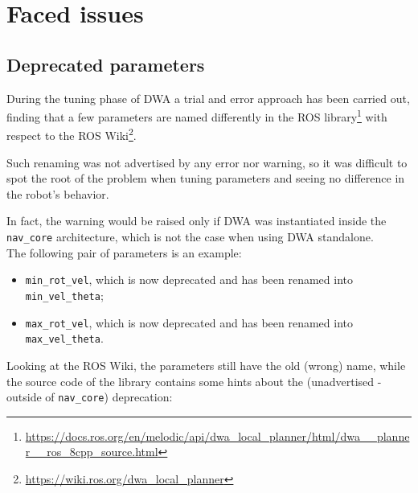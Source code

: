 \documentclass[11pt,a4paper]{article}
\begin{document}
\section{Faced issues}



\subsection{Deprecated parameters}

During the tuning phase of DWA a trial and error approach has been carried out, finding that
a few parameters are named differently in the ROS library\footnote
{\href{https://docs.ros.org/en/melodic/api/dwa\_local\_planner/html/dwa\_\_planner\_\_ros\_8cpp\_source.html}
{https://docs.ros.org/en/melodic/api/dwa\_local\_planner/html/dwa\_\_planner\_\_ros\_8cpp\_source.html}}
with respect to the ROS Wiki\footnote
{\href{https://wiki.ros.org/dwa\_local\_planner}{https://wiki.ros.org/dwa\_local\_planner}}.

Such renaming was not advertised by any error nor warning, so it was difficult to spot the root of the problem
when tuning parameters and seeing no difference in the robot's behavior.

In fact, the warning would be raised only if DWA was instantiated inside the \texttt{nav\_core} architecture,
which is not the case when using DWA standalone.\\

The following pair of parameters is an example:
\begin{itemize}
    \item \texttt{min\_rot\_vel}, which is now deprecated and has been renamed into \texttt{min\_vel\_theta};
    \item \texttt{max\_rot\_vel}, which is now deprecated and has been renamed into \texttt{max\_vel\_theta}.\\
\end{itemize}

Looking at the ROS Wiki, the parameters still have the old (wrong) name, while the source code of the library
contains some hints about the (unadvertised - outside of \texttt{nav\_core}) deprecation:
\end{document}
